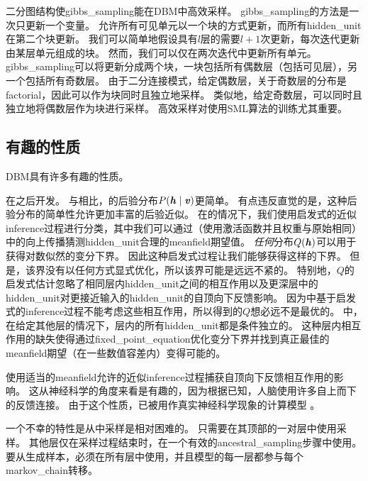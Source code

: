 
二分图结构使\gls{gibbs_sampling}能在\gls{DBM}中高效采样。
\gls{gibbs_sampling}的方法是一次只更新一个变量。
允许所有可见单元以一个块的方式更新，而所有\gls{hidden_unit}在第二个块更新。
我们可以简单地假设具有$l$层的需要$l+1$次更新，每次迭代更新由某层单元组成的块。
然而，我们可以仅在两次迭代中更新所有单元。
\gls{gibbs_sampling}可以将更新分成两个块，一块包括所有偶数层（包括可见层），另一个包括所有奇数层。
由于二分连接模式，给定偶数层，关于奇数层的分布是\gls{factorial}，因此可以作为块同时且独立地采样。
类似地，给定奇数层，可以同时且独立地将偶数层作为块进行采样。
高效采样对使用\gls{SML}算法的训练尤其重要。


\subsection{有趣的性质}
\gls{DBM}具有许多有趣的性质。

在之后开发。
与相比，的后验分布$P(\boldsymbol{\mathit{h}}  \mid  \boldsymbol{\mathit{v}})$更简单。
有点违反直觉的是，这种后验分布的简单性允许更加丰富的后验近似。
在的情况下，我们使用启发式的近似\gls{inference}过程进行分类，其中我们可以通过（使用激活函数并且权重与原始相同）中的向上传播猜测\gls{hidden_unit}合理的\gls{meanfield}期望值。
\emph{任何}分布$Q(\boldsymbol{\mathit{h}})$可以用于获得对数似然的变分下界。
因此这种启发式过程让我们能够获得这样的下界。
但是，该界没有以任何方式显式优化，所以该界可能是远远不紧的。
特别地，$Q$的启发式估计忽略了相同层内\gls{hidden_unit}之间的相互作用以及更深层中的\gls{hidden_unit}对更接近输入的\gls{hidden_unit}的自顶向下反馈影响。
因为中基于启发式的\gls{inference}过程不能考虑这些相互作用，所以得到的$Q$想必远不是最优的。
中，在给定其他层的情况下，层内的所有\gls{hidden_unit}都是条件独立的。
这种层内相互作用的缺失使得通过\gls{fixed_point_equation}优化变分下界并找到真正最佳的\gls{meanfield}期望（在一些数值容差内）变得可能的。


使用适当的\gls{meanfield}允许的近似\gls{inference}过程捕获自顶向下反馈相互作用的影响。
这从神经科学的角度来看是有趣的，因为根据已知，人脑使用许多自上而下的反馈连接。
由于这个性质，已被用作真实神经科学现象的计算模型 \citep{series2010hallucinations,reichert2011neuronal}。


一个不幸的特性是从中采样是相对困难的。
只需要在其顶部的一对层中使用采样。
其他层仅在采样过程结束时，在一个有效的\gls{ancestral_sampling}步骤中使用。
要从生成样本，必须在所有层中使用，并且模型的每一层都参与每个\gls{markov_chain}转移。


